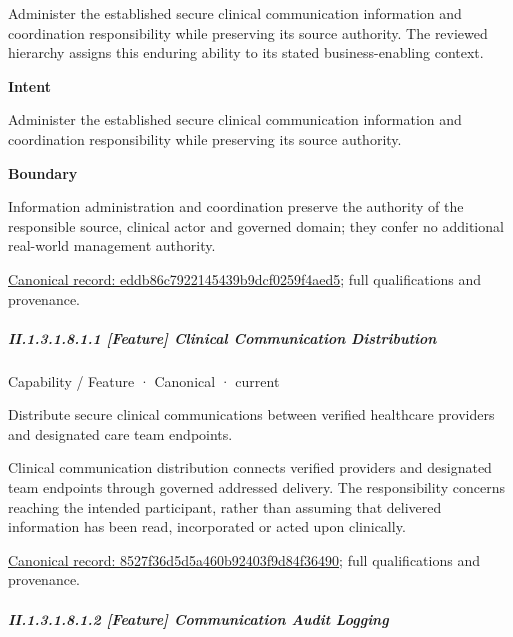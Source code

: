 Administer the established secure clinical communication information and coordination responsibility while preserving its source authority. The reviewed hierarchy assigns this enduring ability to its stated business-enabling context.



\textbf{Intent}



Administer the established secure clinical communication information and coordination responsibility while preserving its source authority.



\textbf{Boundary}



Information administration and coordination preserve the authority of the responsible source, clinical actor and governed domain; they confer no additional real-world management authority.


{\footnotesize \href{../../../../../../../continuum/strategy/capability/eddb86c7922145439b9dcf0259f4aed5.md}{Canonical record: eddb86c7922145439b9dcf0259f4aed5}; full qualifications and provenance.}\par
\subparagraph*{II.1.3.1.8.1.1 [Feature] Clinical Communication Distribution}
\label{navigation:II.1.3.1.8.1.1}

\label{element:8527f36d5d5a460b92403f9d84f36490}
{\small Capability / Feature · Canonical · current}\par

Distribute secure clinical communications between verified healthcare providers and designated care team endpoints.



Clinical communication distribution connects verified providers and designated team endpoints through governed addressed delivery. The responsibility concerns reaching the intended participant, rather than assuming that delivered information has been read, incorporated or acted upon clinically.


{\footnotesize \href{../../../../../../../continuum/strategy/capability/feature/8527f36d5d5a460b92403f9d84f36490.md}{Canonical record: 8527f36d5d5a460b92403f9d84f36490}; full qualifications and provenance.}\par
\subparagraph*{II.1.3.1.8.1.2 [Feature] Communication Audit Logging}
\label{navigation:II.1.3.1.8.1.2}

